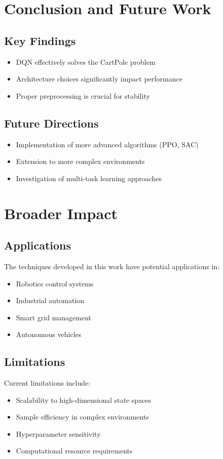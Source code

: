 \documentclass[conference]{IEEEtran}
\begin{document}
\section{Conclusion and Future Work}
\subsection{Key Findings}
\begin{itemize}
    \item DQN effectively solves the CartPole problem
    \item Architecture choices significantly impact performance
    \item Proper preprocessing is crucial for stability
\end{itemize}

\subsection{Future Directions}
\begin{itemize}
    \item Implementation of more advanced algorithms (PPO, SAC)
    \item Extension to more complex environments
    \item Investigation of multi-task learning approaches
\end{itemize}

\section{Broader Impact}
\subsection{Applications}
The techniques developed in this work have potential applications in:
\begin{itemize}
    \item Robotics control systems
    \item Industrial automation
    \item Smart grid management
    \item Autonomous vehicles
\end{itemize}

\subsection{Limitations}
Current limitations include:
\begin{itemize}
    \item Scalability to high-dimensional state spaces
    \item Sample efficiency in complex environments
    \item Hyperparameter sensitivity
    \item Computational resource requirements
\end{itemize}
\end{document}
